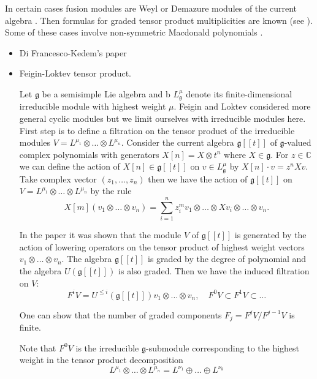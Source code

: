\documentclass[12pt]{iopart}
\newcommand{\gf}{\mathfrak{g}}
\begin{document}
In certain cases fusion modules are Weyl or Demazure modules of the current algebra
\cite{chari2001weyl,chari2006weyl,chari2014modules,chari2015demazure}. Then formulas for graded
tensor product multiplicities are known (see \cite{chari2006weyl,chari2015demazure}). Some of these
cases involve non-symmetric Macdonald polynomials \cite{0803.1146v1}. 

\begin{itemize}
\item Di Francesco-Kedem's paper
\item Feigin-Loktev tensor product.
  
  Let $\gf$ be a semisimple Lie algebra and b $L^{\mu}_{\gf}$ denote its finite-dimensional
  irreducible module with highest weight $\mu$. Feigin and Loktev considered more general cyclic
  modules but we limit ourselves with irreducible modules here. First step is to define a filtration
  on the tensor product of the irreducible modules $V=L^{\mu_{1}}\otimes\dots \otimes L^{\mu_{n}}$.
  Consider the current algebra $\gf[[t]]$ of $\gf$-valued complex polynomials with generators
  $X[n]=X\otimes t^{n}$ where $X\in \gf$. For $z\in\mathbb{C}$ we can define the action of $X[n]\in
  \gf[[t]]$ on $v\in L^{\mu}_{\gf}$ by $X[n]\cdot v = z^{n}X v$. Take complex vector
  $(z_{1},\dots,z_{n})$ then we have the action of $\gf[[t]]$ on $V=L^{\mu_{1}}\otimes\dots \otimes
  L^{\mu_{n}}$ by the rule
  \begin{equation}
    \label{eq:1}
    X[m](v_{1}\otimes \dots\otimes v_{n})=\sum_{i=1}^{n} z_{i}^{m}
    v_{1}\otimes\dots\otimes X v_{i}\otimes\dots\otimes v_{n}.    
  \end{equation}

 In the paper \cite{feigin1999generalized} it was shown that the module $V$ of $\gf[[t]]$ is
 generated by the action of lowering operators on the tensor product of highest weight vectors
 $v_{1}\otimes\dots \otimes v_{n}$. The algebra $\gf[[t]]$ is graded by the degree of polynomial
 and the algebra $U(\gf[[t]])$ is also graded. Then we have the induced filtration on $V$:
 \begin{equation}
   \label{eq:2}
   F^{i}V=U^{\leq i}(\gf[[t]])v_{1}\otimes\dots\otimes v_{n},\quad F^{0}V\subset F^{1}V\subset\dots
 \end{equation}

One can show that the number of graded components $F_{j}=F^{j}V/F^{j-1}V$ is finite. 

 Note that $F^{0}V$ is the irreducible $\gf$-submodule corresponding to the highest weight in the
 tensor product decomposition
 \begin{equation}
   \label{eq:3}
   L^{\mu_{1}}\otimes\dots \otimes L^{\mu_{n}}=L^{\nu_{1}}\oplus\dots\oplus L^{\nu_{k}}
 \end{equation}


\end{itemize}
\end{document}
